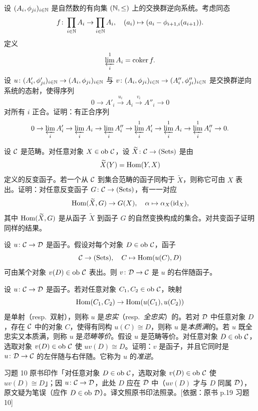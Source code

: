 \begin{exercises}
\item \label{ex:1.1.7} 设 $(A_i,\phi_{ji})_{i\in\mathbb{N}}$ 是自然数的有向集 $(\mathbb{N},\le)$ 上的交换群逆向系统。考虑同态
\[
f\colon\prod_{i\in\mathbb{N}}A_i\to\prod_{i\in\mathbb{N}}A_i,\quad (a_i)\mapsto(a_i-\phi_{i+1,i}(a_{i+1})).
\]
定义
\[
\varprojlim_i^1A_i=\operatorname{coker} f.
\]
设 $u\colon(A'_i,\phi'_{ji})_{i\in\mathbb{N}}\to(A_i,\phi_{ji})_{i\in\mathbb{N}}$ 与 $v\colon(A_i,\phi_{ji})_{i\in\mathbb{N}}\to(A''_i,\phi''_{ji})_{i\in\mathbb{N}}$ 是交换群逆向系统的态射，使得序列
\[
0\to A'_i\xrightarrow{u_i}A_i\xrightarrow{v_i}A''_i\to 0
\]
对所有 $i$ 正合。证明：有正合序列
\[
0\to\varprojlim_i A'_i\to\varprojlim_i A_i\to\varprojlim_i A''_i\to\varprojlim_i^1A'_i\to\varprojlim_i^1A_i\to\varprojlim_i^1A''_i\to 0.
\]

\item \label{ex:1.1.8} 设 $\mathcal{C}$ 是范畴。对任意对象 $X\in\operatorname{ob}\,\mathcal{C}$，设 $\widetilde X\colon\mathcal{C}\to(\mathrm{Sets})$ 是由
\[
\widetilde X(Y)=\operatorname{Hom}(Y,X)
\]
定义的反变函子。若一个从 $\mathcal{C}$ 到集合范畴的函子同构于 $\widetilde X$，则称它可由 $X$ 表出。证明：对任意反变函子 $G\colon\mathcal{C}\to(\mathrm{Sets})$，有一一对应
\[
\operatorname{Hom}(\widetilde X,G)\to G(X),\quad \alpha\mapsto\alpha_X(\operatorname{id}_X),
\]
其中 $\operatorname{Hom}(\widetilde X,G)$ 是从函子 $\widetilde X$ 到函子 $G$ 的自然变换构成的集合。对共变函子证明同样的结果。

\item \label{ex:1.1.9} 设 $u\colon\mathcal{C}\to\mathcal{D}$ 是函子。假设对每个对象 $D\in\operatorname{ob}\,\mathcal{C}$，函子
\[
\mathcal{C}\to(\mathrm{Sets}),\quad C\mapsto\operatorname{Hom}(u(C),D)
\]
可由某个对象 $v(D)\in\operatorname{ob}\,\mathcal{C}$ 表出。则 $v\colon\mathcal{D}\to\mathcal{C}$ 是 $u$ 的右伴随函子。

\item \label{ex:1.1.10} 设 $u\colon\mathcal{C}\to\mathcal{D}$ 是函子。若对任意对象 $C_1,C_2\in\operatorname{ob}\,\mathcal{C}$，映射
\[
\operatorname{Hom}(C_1,C_2)\to\operatorname{Hom}(u(C_1),u(C_2))
\]
是单射（resp.\ 双射），则称 $u$ 是\emph{忠实}（resp.\ \emph{全忠实}）的。若对 $\mathcal{D}$ 中任意对象 $D$，存在 $\mathcal{C}$ 中的对象 $C$，使得有同构 $u(C)\cong D$，则称 $u$ 是\emph{本质满}的。若 $u$ 既全忠实又本质满，则称 $u$ 是\emph{范畴等价}。假设 $u$ 是范畴等价。对任意对象 $D\in\operatorname{ob}\,\mathcal{C}$，选取对象 $v(D)\in\operatorname{ob}\,\mathcal{C}$ 使 $uv(D)\cong D$。证明：$v$ 是函子，并且它同时是 $u\colon\mathcal{D}\to\mathcal{C}$ 的左伴随与右伴随。它称为 $u$ 的\emph{准逆}。

\begin{tnote}
习题 10 原书印作「对任意对象 $D\in\operatorname{ob}\,\mathcal{C}$，选取对象 $v(D)\in\operatorname{ob}\,\mathcal{C}$ 使 $uv(D)\cong D$」；因 $u\colon\mathcal{C}\to\mathcal{D}$，此处 $D$ 应在 $\mathcal{D}$ 中（$uv(D)$ 才与 $D$ 同属 $\mathcal{D}$），原文疑为笔误（应作 $D\in\operatorname{ob}\,\mathcal{D}$）。译文照原书印法照录。[依据：原书 p.19 习题 10]
\end{tnote}
\end{exercises}
